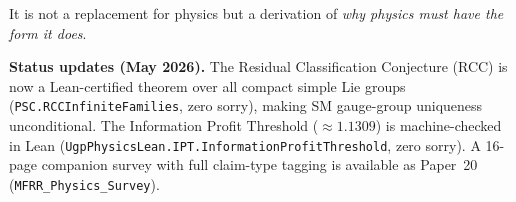 \documentclass[11pt]{article}
\begin{document}
It is not a replacement for physics but a derivation of \emph{why physics must have the form it does}.

\medskip
\noindent\textbf{Status updates (May 2026).}
The Residual Classification Conjecture (RCC) is now a Lean-certified theorem over all compact simple Lie groups (\texttt{PSC.RCCInfiniteFamilies}, zero sorry), making SM gauge-group uniqueness unconditional. The Information Profit Threshold ($\approx1.1309$) is machine-checked in Lean (\texttt{UgpPhysicsLean.IPT.InformationProfitThreshold}, zero sorry). A 16-page companion survey with full claim-type tagging is available as Paper~20 (\texttt{MFRR\_Physics\_Survey}).
\end{document}
